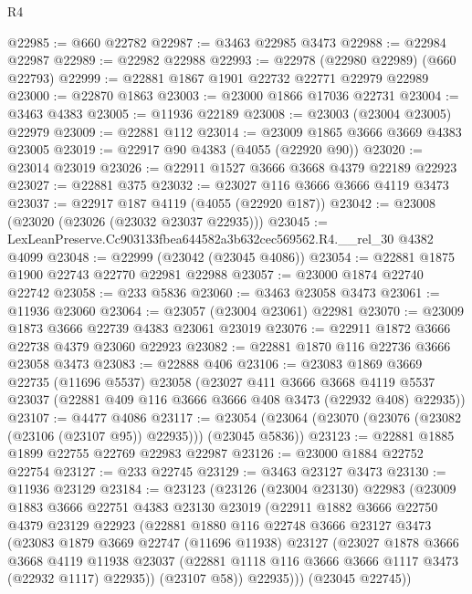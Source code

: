 \begin{lexlean}{R4}
\begin{coremodule}
@22985 := @660 @22782
@22987 := @3463 @22985 @3473
@22988 := @22984 @22987
@22989 := @22982 @22988
@22993 := @22978 (@22980 @22989) (@660 @22793)
@22999 := @22881 @1867 @1901 @22732 @22771 @22979 @22989
@23000 := @22870 @1863
@23003 := @23000 @1866 @17036 @22731
@23004 := @3463 @4383
@23005 := @11936 @22189
@23008 := @23003 (@23004 @23005) @22979
@23009 := @22881 @112
@23014 := @23009 @1865 @3666 @3669 @4383 @23005
@23019 := @22917 @90 @4383 (@4055 (@22920 @90))
@23020 := @23014 @23019
@23026 := @22911 @1527 @3666 @3668 @4379 @22189 @22923
@23027 := @22881 @375
@23032 := @23027 @116 @3666 @3666 @4119 @3473
@23037 := @22917 @187 @4119 (@4055 (@22920 @187))
@23042 := @23008 (@23020 (@23026 (@23032 @23037 @22935)))
@23045 := LexLeanPreserve.Cc903133fbea644582a3b632cec569562.R4.__rel_30 @4382 @4099
@23048 := @22999 (@23042 (@23045 @4086))
@23054 := @22881 @1875 @1900 @22743 @22770 @22981 @22988
@23057 := @23000 @1874 @22740 @22742
@23058 := @233 @5836
@23060 := @3463 @23058 @3473
@23061 := @11936 @23060
@23064 := @23057 (@23004 @23061) @22981
@23070 := @23009 @1873 @3666 @22739 @4383 @23061 @23019
@23076 := @22911 @1872 @3666 @22738 @4379 @23060 @22923
@23082 := @22881 @1870 @116 @22736 @3666 @23058 @3473
@23083 := @22888 @406
@23106 := @23083
    @1869
    @3669
    @22735
    (@11696 @5537)
    @23058
    (@23027
      @411
      @3666
      @3668
      @4119
      @5537
      @23037
      (@22881 @409 @116 @3666 @3666 @408 @3473 (@22932 @408) @22935))
@23107 := @4477 @4086
@23117 := @23054 (@23064 (@23070 (@23076 (@23082 (@23106 (@23107 @95)) @22935))) (@23045 @5836))
@23123 := @22881 @1885 @1899 @22755 @22769 @22983 @22987
@23126 := @23000 @1884 @22752 @22754
@23127 := @233 @22745
@23129 := @3463 @23127 @3473
@23130 := @11936 @23129
@23184 := @23123
    (@23126
      (@23004 @23130)
      @22983
      (@23009
        @1883
        @3666
        @22751
        @4383
        @23130
        @23019
        (@22911
          @1882
          @3666
          @22750
          @4379
          @23129
          @22923
          (@22881
            @1880
            @116
            @22748
            @3666
            @23127
            @3473
            (@23083
              @1879
              @3669
              @22747
              (@11696 @11938)
              @23127
              (@23027
                @1878
                @3666
                @3668
                @4119
                @11938
                @23037
                (@22881 @1118 @116 @3666 @3666 @1117 @3473 (@22932 @1117) @22935))
              (@23107 @58))
            @22935)))
      (@23045 @22745))

\end{coremodule}
\end{lexlean}
